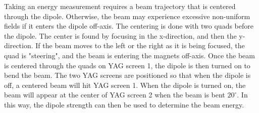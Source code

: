 \documentclass{iitthesis}
\begin{document}
Taking an energy measurement requires a beam trajectory
that is centered through the dipole. Otherwise, the beam 
may experience excessive non-uniform fields 
if it enters the dipole off-axis. The centering is done with two 
quads before the dipole. The center is found by focusing 
in the x-direction, and then the y-direction. If the beam 
moves to the left or the right as it is being focused, 
the quad is "steering", and the beam is entering the magnets off-axis.
Once the beam is centered through the quads on YAG screen 1, 
the dipole is then turned on to bend the beam.
The two YAG screens are positioned so that when the dipole is off, 
a centered beam will hit YAG screen 1. When the dipole is turned
on, the beam will appear at the center of YAG screen 2 when the 
beam is bent $20^\circ$. In this way, the dipole strength can 
then be used to determine the beam energy.
\end{document}
